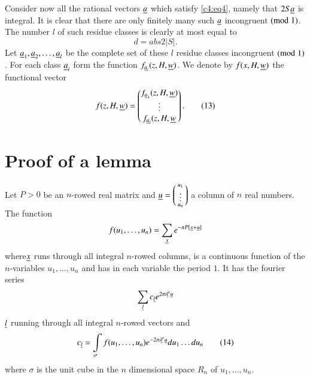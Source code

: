 Consider now all the rational vectors $\underline{a}$ which satisfy
\eqref{c4:eq4}, namely that $2S\underline{a}$ is integral. It is clear that there
are only finitely many such $\underline{a}$ incongruent $(\rm{mod} \; 1)$. The number
$l$ of such residue classes is clearly at most equal to
\begin{equation*}
d=abs 2 |S|.\tag{12}\label{c4:eq12}
\end{equation*}
Let $\underline{a}_{1},\underline{a}_{2},\ldots,\underline{a}_{l}$ be the complete set of
these $l$ residue classes incongruent $(\rm{mod} \; 1)$. For each class
$\underline{a}_{i}$ form the function $f_{\underline{a}_{i}}(z,H,\underline{w})$. We denote
by $f(x,H,\underline{w})$ the functional vector
\begin{equation*}
f(z,H,\underline{w})=
\begin{pmatrix}
f_{\underline{a}_{1}}(z,H,\underline{w})\\
\vdots\\
f_{\underline{a}_{l}}(z,H, \underline{w}
\end{pmatrix}.\tag{13}\label{c4:eq13}
\end{equation*}

\section{Proof of a lemma}\label{chap4:sec2}

Let $P>0$ be an $n$-rowed real matrix and
$\underline{u}=\left(\begin{smallmatrix} u_{1} \\ \vdots\\ u_{n}
\end{smallmatrix}\right)$ a column of $n$ real numbers. The function
$$
f(u_{1},\ldots,u_{n})=\sum_{\underline{x}}e^{-\pi P[\underline{x}+\underline{u}]}
$$
where\pageoriginale $\underline{x}$ runs through all integral $n$-rowed
columns, is a continuous function of the $n$-variables
$u_{1},\ldots,u_{n}$ and has in each variable the period $1$. It has
the fourier series
$$
\sum_{\underline{l}}c_{\underline{l}}e^{2\pi i\underline{l}'\underline{u}}
$$
$\underline{l}$ running through all integral $n$-rowed vectors and
\begin{equation*}
c_{\underline{l}}=\int\limits_{\sigma}f(u_{1},\ldots,u_{n})e^{-2\pi
  i\underline{l}'\underline{u}}du_{1}\ldots du_{n}\tag{14}\label{c4:eq14}
\end{equation*}
where $\sigma$ is the unit cube in the $n$ dimensional space $R_{n}$
of $u_{1},\ldots,u_{n}$.

